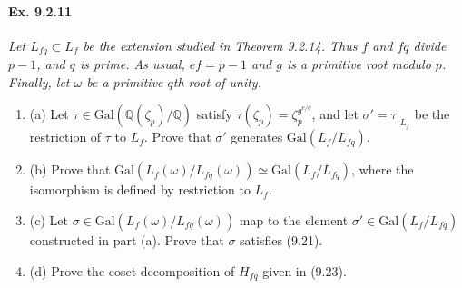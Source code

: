 \documentclass[11pt,a4paper]{article}
\newcommand{\be} {\begin{enumerate}}
\newcommand{\ee} {\end{enumerate}}
\newcommand{\Q}{\mathbb{Q}}
\newcommand{\Gal}{\mathrm{Gal}}
\begin{document}
\paragraph{Ex. 9.2.11}

{\it Let $L_{fq} \subset L_f$ be the extension studied in Theorem 9.2.14. Thus $f$ and $fq$ divide $p-1$, and $q$ is prime. As usual, $ef=p-1$ and $g$ is a primitive root modulo $p$. Finally, let $\omega$ be a primitive $q$th root of unity.
\be
\item[(a)] Let $\tau \in \Gal(\Q(\zeta_p)/\Q)$ satisfy $\tau(\zeta_p) = \zeta_p^{g^{e/q}}$, and let $\sigma' = \tau|_{L_f}$ be the restriction of $\tau$ to $L_f$. Prove that $\sigma'$ generates $\Gal(L_f/L_{fq})$.
\item[(b)] Prove that $\Gal(L_f(\omega)/L_{fq}(\omega))\simeq \Gal(L_f/L_{fq})$, where the isomorphism is defined by restriction to $L_f$.
\item[(c)] Let $\sigma \in \Gal(L_f(\omega)/L_{fq}(\omega))$ map to the element $\sigma' \in \Gal(L_f/L_{fq})$ constructed in part (a). Prove that $\sigma$ satisfies (9.21).
\item[(d)] Prove the coset decomposition of $H_{fq}$ given in (9.23).
\ee
}
\end{document}
